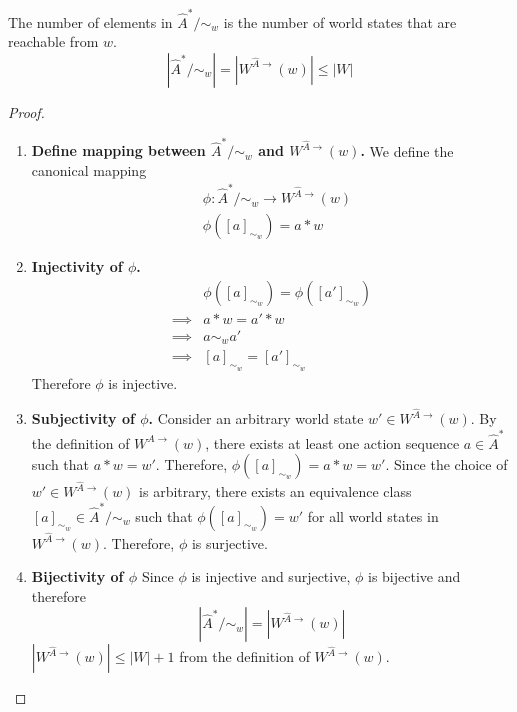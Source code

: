 \begin{proposition}\label{prp:local_algebra_cardinality}
The number of elements in $\hat{A}^{*}/\sim_{w}$ is the number of world states that are reachable from $w$.
    \begin{equation}
        |\hat{A}^{*}/\sim_{w}| = |W^{\hat{A}\to}(w)| \leq |W|
    \end{equation}
\end{proposition}
\begin{proof}
\begin{enumerate}[(1)]
    \item \textbf{Define mapping between $\hat{A}^{*}/\sim_{w}$ and $W^{\hat{A}\to}(w)$.}
    We define the canonical mapping
    \begin{equation}
    \begin{aligned}
        & \phi: \hat{A}^{*}/\sim_{w} \to W^{\hat{A}\to}(w) \\
        & \phi([a]_{\sim_{w}}) = a \ast w
    \end{aligned}
    \end{equation}

    \item \textbf{Injectivity of $\phi$.}
    \begin{align}
        & \phi([a]_{\sim_{w}}) = \phi([a']_{\sim_{w}}) \\
        \implies & a \ast w = a' \ast w \\
        \implies & a \sim_{w} a' \\
        \implies & [a]_{\sim_{w}} = [a']_{\sim_{w}}
    \end{align}
    Therefore $\phi$ is injective.

    \item \textbf{Subjectivity of $\phi$.}
    Consider an arbitrary world state $w' \in W^{\hat{A}\to}(w)$.
    By the definition of $W^{\hat{A}\to}(w)$, there exists at least one action sequence $a \in \hat{A}^{*}$ such that $a \ast w = w'$.
    Therefore, $\phi([a]_{\sim_{w}}) = a \ast w = w'$.
    Since the choice of $w' \in W^{\hat{A}\to}(w)$ is arbitrary, there exists an equivalence class $[a]_{\sim_{w}} \in \hat{A}^{*}/\sim_{w}$ such that $\phi([a]_{\sim_{w}}) = w'$ for all world states in $W^{\hat{A}\to}(w)$.
    Therefore, $\phi$ is surjective.

    \item \textbf{Bijectivity of $\phi$}
    Since $\phi$ is injective and surjective, $\phi$ is bijective and therefore
    \begin{equation}
        |\hat{A}^{*}/\sim_{w}| = |W^{\hat{A}\to}(w)|
    \end{equation}
    $|W^{\hat{A}\to}(w)| \leq |W| + 1$ from the definition of $W^{\hat{A}\to}(w)$.
\end{enumerate}
\end{proof}


